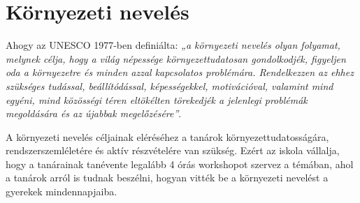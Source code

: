 \hypertarget{kornyezeti-neveles}{%
\section{Környezeti nevelés}\label{kornyezeti-neveles}}

Ahogy az UNESCO 1977-ben definiálta: \emph{„a környezeti nevelés olyan
folyamat, melynek célja, hogy a világ népessége környezettudatosan
gondolkodjék, figyeljen oda a környezetre és minden azzal kapcsolatos
problémára. Rendelkezzen az ehhez szükséges tudással, beállítódással,
képességekkel, motivációval, valamint mind egyéni, mind közösségi téren
eltökélten törekedjék a jelenlegi problémák megoldására és az újabbak
megelőzésére''}.

A környezeti nevelés céljainak eléréséhez a tanárok
környezettudatosságára, rendszerszemléletére és aktív részvételére van
szükség. Ezért az iskola vállalja, hogy a tanárainak tanévente legalább
4 órás workshopot szervez a témában, ahol a tanárok arról is tudnak
beszélni, hogyan vitték be a környezeti nevelést a gyerekek
mindennapjaiba.
